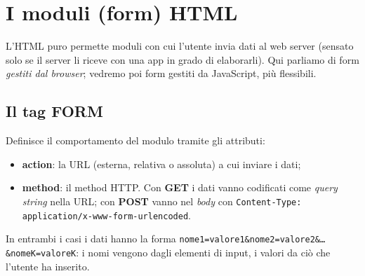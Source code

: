 \section{I moduli (form) HTML}

L'HTML puro permette moduli con cui l'utente invia dati al web server (sensato solo se il
server li riceve con una app in grado di elaborarli). Qui parliamo di form \emph{gestiti dal
browser}; vedremo poi form gestiti da JavaScript, pi\`u flessibili.

\subsection{Il tag FORM}
Definisce il comportamento del modulo tramite gli attributi:
\begin{itemize}
  \item \textbf{action}: la URL (esterna, relativa o assoluta) a cui inviare i dati;
  \item \textbf{method}: il method HTTP. Con \textbf{GET} i dati vanno codificati come
        \emph{query string} nella URL; con \textbf{POST} vanno nel \emph{body} con
        \texttt{Content-Type: application/x-www-form-urlencoded}.
\end{itemize}
In entrambi i casi i dati hanno la forma
\texttt{nome1=valore1\&nome2=valore2\&\dots\&nomeK=valoreK}: i nomi vengono dagli elementi
di input, i valori da ci\`o che l'utente ha inserito.

